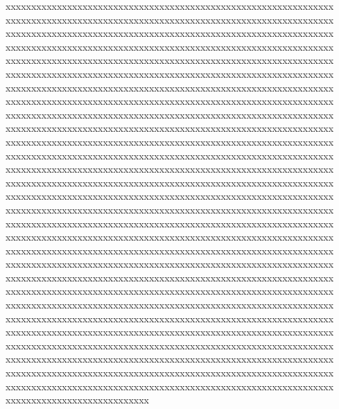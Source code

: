 {{xxxxxxxxxxxxxxxxxxxxxxxxxxxxxxxxxxxxxxxxxxxxxxxxxxxxxxxxxxxxxxxx%
xxxxxxxxxxxxxxxxxxxxxxxxxxxxxxxxxxxxxxxxxxxxxxxxxxxxxxxxxxxxxxxx%
xxxxxxxxxxxxxxxxxxxxxxxxxxxxxxxxxxxxxxxxxxxxxxxxxxxxxxxxxxxxxxxx%
xxxxxxxxxxxxxxxxxxxxxxxxxxxxxxxxxxxxxxxxxxxxxxxxxxxxxxxxxxxxxxxx%
xxxxxxxxxxxxxxxxxxxxxxxxxxxxxxxxxxxxxxxxxxxxxxxxxxxxxxxxxxxxxxxx%
xxxxxxxxxxxxxxxxxxxxxxxxxxxxxxxxxxxxxxxxxxxxxxxxxxxxxxxxxxxxxxxx%
xxxxxxxxxxxxxxxxxxxxxxxxxxxxxxxxxxxxxxxxxxxxxxxxxxxxxxxxxxxxxxxx%
xxxxxxxxxxxxxxxxxxxxxxxxxxxxxxxxxxxxxxxxxxxxxxxxxxxxxxxxxxxxxxxx%
xxxxxxxxxxxxxxxxxxxxxxxxxxxxxxxxxxxxxxxxxxxxxxxxxxxxxxxxxxxxxxxx%
xxxxxxxxxxxxxxxxxxxxxxxxxxxxxxxxxxxxxxxxxxxxxxxxxxxxxxxxxxxxxxxx%
xxxxxxxxxxxxxxxxxxxxxxxxxxxxxxxxxxxxxxxxxxxxxxxxxxxxxxxxxxxxxxxx%
xxxxxxxxxxxxxxxxxxxxxxxxxxxxxxxxxxxxxxxxxxxxxxxxxxxxxxxxxxxxxxxx%
xxxxxxxxxxxxxxxxxxxxxxxxxxxxxxxxxxxxxxxxxxxxxxxxxxxxxxxxxxxxxxxx%
xxxxxxxxxxxxxxxxxxxxxxxxxxxxxxxxxxxxxxxxxxxxxxxxxxxxxxxxxxxxxxxx%
xxxxxxxxxxxxxxxxxxxxxxxxxxxxxxxxxxxxxxxxxxxxxxxxxxxxxxxxxxxxxxxx%
xxxxxxxxxxxxxxxxxxxxxxxxxxxxxxxxxxxxxxxxxxxxxxxxxxxxxxxxxxxxxxxx%
xxxxxxxxxxxxxxxxxxxxxxxxxxxxxxxxxxxxxxxxxxxxxxxxxxxxxxxxxxxxxxxx%
xxxxxxxxxxxxxxxxxxxxxxxxxxxxxxxxxxxxxxxxxxxxxxxxxxxxxxxxxxxxxxxx%
xxxxxxxxxxxxxxxxxxxxxxxxxxxxxxxxxxxxxxxxxxxxxxxxxxxxxxxxxxxxxxxx%
xxxxxxxxxxxxxxxxxxxxxxxxxxxxxxxxxxxxxxxxxxxxxxxxxxxxxxxxxxxxxxxx%
xxxxxxxxxxxxxxxxxxxxxxxxxxxxxxxxxxxxxxxxxxxxxxxxxxxxxxxxxxxxxxxx%
xxxxxxxxxxxxxxxxxxxxxxxxxxxxxxxxxxxxxxxxxxxxxxxxxxxxxxxxxxxxxxxx%
xxxxxxxxxxxxxxxxxxxxxxxxxxxxxxxxxxxxxxxxxxxxxxxxxxxxxxxxxxxxxxxx%
xxxxxxxxxxxxxxxxxxxxxxxxxxxxxxxxxxxxxxxxxxxxxxxxxxxxxxxxxxxxxxxx%
xxxxxxxxxxxxxxxxxxxxxxxxxxxxxxxxxxxxxxxxxxxxxxxxxxxxxxxxxxxxxxxx%
xxxxxxxxxxxxxxxxxxxxxxxxxxxxxxxxxxxxxxxxxxxxxxxxxxxxxxxxxxxxxxxx%
xxxxxxxxxxxxxxxxxxxxxxxxxxxxxxxxxxxxxxxxxxxxxxxxxxxxxxxxxxxxxxxx%
xxxxxxxxxxxxxxxxxxxxxxxxxxxxxxxxxxxxxxxxxxxxxxxxxxxxxxxxxxxxxxxx%
xxxxxxxxxxxxxxxxxxxxxxxxxxxxxxxxxxxxxxxxxxxxxxxxxxxxxxxxxxxxxxxx%
xxxxxxxxxxxxxxxxxxxxxxxxxxxx}\edef\b{\a}\message{UMBER:\ifx\a\b Y\else N\fi:END}
}
